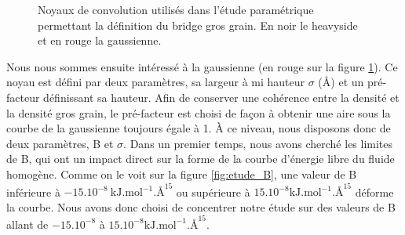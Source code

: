 
\begin{figure}[H]
    \center    
    \caption[Noyaux de convolution utilisés dans l'étude paramétrique permettant la définition du bridge gros grain.]{Noyaux de convolution utilisés dans l'étude paramétrique permettant la définition du bridge gros grain. En noir le heavyside et en rouge la gaussienne.}
    \label{fig:noyaux}
\end{figure}



Nous nous sommes ensuite intéressé à la gaussienne (en rouge sur la figure \ref{fig:noyaux}). Ce noyau est défini par deux paramètres, sa largeur à mi hauteur $\sigma$ (\AA) et un pré-facteur définissant sa hauteur. Afin de conserver une cohérence entre la densité et la densité gros grain, le pré-facteur est choisi de façon à obtenir une aire sous la courbe de la gaussienne toujours égale à 1. \`A ce niveau, nous disposons donc de deux paramètres, B et $\sigma$. Dans un premier temps, nous avons cherché les limites de B, qui ont un impact direct sur la forme de la courbe d'énergie libre du fluide homogène. Comme on le voit sur la figure \ref{fig:etude_B}, une valeur de B inférieure à $-15.10^{-8}\  \mathrm{kJ.mol}^{-1}.\text{\AA}^{15}$ ou supérieure à $15.10^{-8} \mathrm{kJ.mol}^{-1}.\text{\AA}^{15}$ déforme la courbe. Nous avons donc choisi de concentrer notre étude sur des valeurs de B allant de $-15.10^{-8}$ à $15.10^{-8} \mathrm{kJ.mol}^{-1}.\text{\AA}^{15}$.




